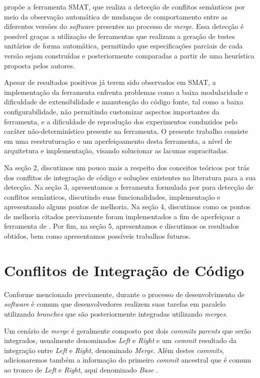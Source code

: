 \documentclass[12pt]{article}
\begin{document}
\cite{leuson:icsme} propõe a ferramenta SMAT, que realiza a detecção de conflitos semânticos por meio da observação automática de mudanças de comportamento entre as diferentes versões do \textit{software} presentes no processo de \textit{merge}. Essa detecção é possível graças a utilização de ferramentas que realizam a geração de testes unitários de forma automática, permitindo que especificações parciais de cada versão sejam construídas e posteriormente comparadas a partir de uma heurística proposta pelos autores.

Apesar de resultados positivos já terem sido observados em SMAT, a implementação da ferramenta enfrenta problemas como a baixa modularidade e dificuldade de extensibilidade e manutenção do código fonte, tal como a baixa configurabilidade, não permitindo customizar aspectos importantes da ferramenta, e a dificuldade de reprodução dos experimentos conduzidos pelo caráter não-determinístico presente na ferramenta. O presente trabalho consiste em uma reestruturação e um aperfeiçoamento desta ferramenta, a nível de arquitetura e implementação, visando solucionar as lacunas supracitadas.

Na seção 2, discutimos um pouco mais a respeito dos conceitos teóricos por trás dos conflitos de integração de código e soluções existentes na literatura para a sua detecção. Na seção 3, apresentamos a ferramenta formulada por \cite{leuson:icsme} para detecção de conflitos semânticos, discutindo suas funcionalidades, implementação e apresentando alguns pontos de melhoria. Na seção 4, discutimos como os pontos de melhoria citados previamente foram implementados a fim de aperfeiçoar a ferramenta de \cite{leuson:icsme}. Por fim, na seção 5, apresentamos e discutimos os resultados obtidos, bem como apresentamos possíveis trabalhos futuros.

\section{Conflitos de Integração de Código}
Conforme mencionado previamente, durante o processo de desenvolvimento de \textit{software} é comum que desenvolvedores realizem suas tarefas em paralelo utilizando \textit{branches} que são posteriormente integradas utilizando \textit{merges}.

Um cenário de \textit{merge} é geralmente composto por dois \textit{commits} \textit{parents} que serão integrados, usualmente denominados \textit{Left} e \textit{Right} e um \textit{commit} resultado da integração entre \textit{Left} e \textit{Right}, denominado \textit{Merge}. Além destes \textit{commits}, adicionaremos também a informação do primeiro \textit{commit} ancestral que é comum ao tronco de \textit{Left} e \textit{Right}, aqui denominado \textit{Base} \cite{leuson:tese}.
\end{document}
